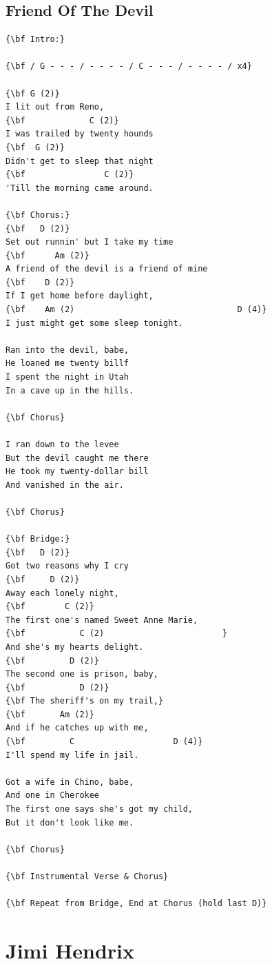 \documentclass[a4paper]{article}
\begin{document}
\subsection{Friend Of The Devil} %
\label{sub:Friend Of The Devil}

\begin{Verbatim}[commandchars=\\\{\}]
{\bf Intro:}

{\bf / G - - - / - - - - / C - - - / - - - - / x4}

{\bf G (2)}
I lit out from Reno,
{\bf             C (2)}
I was trailed by twenty hounds
{\bf  G (2)}
Didn't get to sleep that night
{\bf                C (2)}
'Till the morning came around.

{\bf Chorus:}
{\bf   D (2)}
Set out runnin' but I take my time
{\bf      Am (2)}
A friend of the devil is a friend of mine
{\bf    D (2)}
If I get home before daylight,
{\bf    Am (2)                                 D (4)}
I just might get some sleep tonight.

Ran into the devil, babe,
He loaned me twenty billf
I spent the night in Utah
In a cave up in the hills.

{\bf Chorus}

I ran down to the levee
But the devil caught me there
He took my twenty-dollar bill
And vanished in the air.

{\bf Chorus}

{\bf Bridge:}
{\bf   D (2)}
Got two reasons why I cry
{\bf     D (2)}
Away each lonely night,
{\bf        C (2)}
The first one's named Sweet Anne Marie,
{\bf           C (2)                        }
And she's my hearts delight.
{\bf         D (2)}
The second one is prison, baby,
{\bf           D (2)}
{\bf The sheriff's on my trail,}
{\bf       Am (2)}
And if he catches up with me,
{\bf         C                    D (4)}
I'll spend my life in jail.

Got a wife in Chino, babe,
And one in Cherokee
The first one says she's got my child,
But it don't look like me.

{\bf Chorus}

{\bf Instrumental Verse & Chorus}

{\bf Repeat from Bridge, End at Chorus (hold last D)}
\end{Verbatim}
\newpage
\section{Jimi Hendrix} %
\label{sec:Jimi Hendrix}
\end{document}
